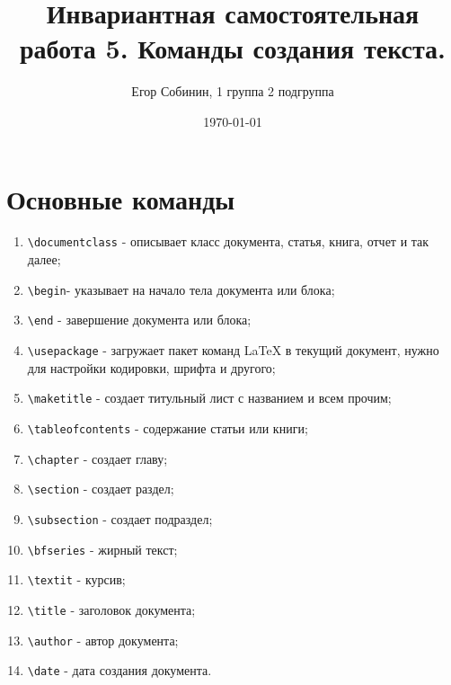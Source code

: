 \documentclass[a4paper,12pt]{article} %
\author{Егор Собинин, 1 группа 2 подгруппа}
\title{Инвариантная самостоятельная работа 5. Команды создания текста.}
\date{\today}
\begin{document}
\maketitle
\newpage
\section{Основные команды}
\begin{enumerate} 
\item \verb|\documentclass| - описывает класс документа, статья, книга, отчет и так далее;
\item \verb|\begin|- указывает на начало тела документа или блока;
\item \verb|\end| - завершение документа или блока;
\item \verb|\usepackage| - загружает пакет команд LaTeX в текущий документ, нужно для настройки кодировки, шрифта и другого;
\item \verb|\maketitle| - создает титульный лист с названием и всем прочим;
\item \verb|\tableofcontents| - содержание статьи или книги;
\item \verb|\chapter| - создает главу;
\item \verb|\section| - создает раздел;
\item \verb|\subsection| - создает подраздел;
\item \verb|\bfseries| - жирный текст;
\item \verb|\textit| - курсив;
\item \verb|\title| - заголовок документа;
\item \verb|\author| - автор документа;
\item \verb|\date| - дата создания документа.
\end{enumerate}
\end{document}
